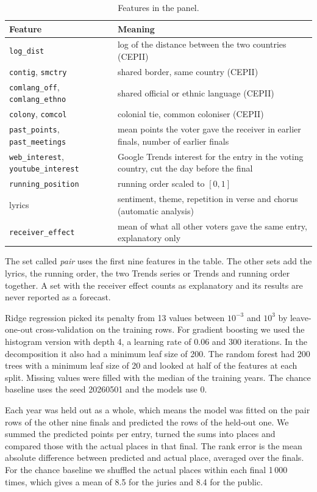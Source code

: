 \documentclass[a4paper,10pt]{article}
\begin{document}
\begin{table}[h]
\centering\small
\begin{tabular}{@{}ll@{}}
\toprule
Feature & Meaning\\
\midrule
\texttt{log\_dist} & log of the distance between the two countries (CEPII)\\
\texttt{contig}, \texttt{smctry} & shared border, same country (CEPII)\\
\texttt{comlang\_off}, \texttt{comlang\_ethno} & shared official or ethnic language (CEPII)\\
\texttt{colony}, \texttt{comcol} & colonial tie, common coloniser (CEPII)\\
\texttt{past\_points}, \texttt{past\_meetings} & mean points the voter gave the receiver in earlier finals, number of earlier finals\\
\texttt{web\_interest}, \texttt{youtube\_interest} & Google Trends interest for the entry in the voting country, cut the day before the final\\
\texttt{running\_position} & running order scaled to $[0,1]$\\
lyrics & sentiment, theme, repetition in verse and chorus (automatic analysis)\\
\texttt{receiver\_effect} & mean of what all other voters gave the same entry, explanatory only\\
\bottomrule
\end{tabular}

\caption{Features in the panel.}
\label{tab:features}
\end{table}

The set called \emph{pair} uses the first nine features in the table.
The other sets add the lyrics, the running order, the two Trends series or Trends and running order together.
A set with the receiver effect counts as explanatory and its results are never reported as a forecast.

Ridge regression picked its penalty from 13 values between $10^{-3}$ and $10^{3}$ by leave-one-out cross-validation on the training rows.
For gradient boosting we used the histogram version with depth 4, a learning rate of 0.06 and 300 iterations.
In the decomposition it also had a minimum leaf size of 200.
The random forest had 200 trees with a minimum leaf size of 20 and looked at half of the features at each split.
Missing values were filled with the median of the training years.
The chance baseline uses the seed 20260501 and the models use 0.

Each year was held out as a whole, which means the model was fitted on the pair rows of the other nine finals and predicted the rows of the held-out one.
We summed the predicted points per entry, turned the sums into places and compared those with the actual places in that final.
The rank error is the mean absolute difference between predicted and actual place, averaged over the finals.
For the chance baseline we shuffled the actual places within each final 1\,000 times, which gives a mean of 8.5 for the juries and 8.4 for the public.
\end{document}
